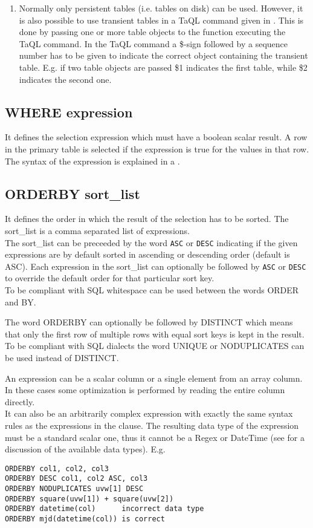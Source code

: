 \begin{enumerate}
\item
Normally only persistent tables (i.e. tables on disk) can
be used. However, it is also possible to use transient tables
in a TaQL command given in
.
This is done by passing one or more table objects to the
function executing the TaQL command. In the TaQL command a
\$-sign followed by a sequence number has to be given to
indicate the correct object containing the transient table.
E.g. if two
table objects are passed \$1 indicates the first table, while \$2
indicates the second one.
\end{enumerate}

\subsection{\label{TAQL:WHERE}WHERE expression}
It defines the selection expression which must have a boolean
scalar result. A row in the primary table
is selected if the expression is true for the values in that row.
The syntax of the expression is explained
in a .

\subsection{\label{TAQL:ORDERBY}ORDERBY sort\_list}
It defines the order in which the result of the selection
has to be sorted. The sort\_list is a comma separated list of
expressions.
\\The sort\_list can be preceeded by the word \texttt{ASC} or
\texttt{DESC} indicating if the given expressions are by
default sorted in ascending or descending order (default is ASC).
Each expression in the sort\_list can optionally be
followed by \texttt{ASC} or \texttt{DESC} to override the
default order for that particular sort key.
\\To be compliant with SQL whitespace can be used between the
words ORDER and BY.

The word ORDERBY can optionally be followed by DISTINCT
which means that only the first row of multiple rows with
equal sort keys is kept in the result. To be compliant with
SQL dialects the word UNIQUE or NODUPLICATES can be used
instead of DISTINCT.

An expression can be a scalar column or a single element from
an array column. In these cases some optimization is performed
by reading the entire column directly.
\\It can also be an arbitrarily complex expression
with exactly the same syntax rules as the expressions in the
 clause.
The resulting data type of the expression must
be a standard scalar one, thus it cannot be a Regex or
DateTime (see  for a discussion
of the available data types).
E.g.
\begin{verbatim}
ORDERBY col1, col2, col3
ORDERBY DESC col1, col2 ASC, col3
ORDERBY NODUPLICATES uvw[1] DESC
ORDERBY square(uvw[1]) + square(uvw[2])
ORDERBY datetime(col)      incorrect data type
ORDERBY mjd(datetime(col)) is correct
\end{verbatim}

